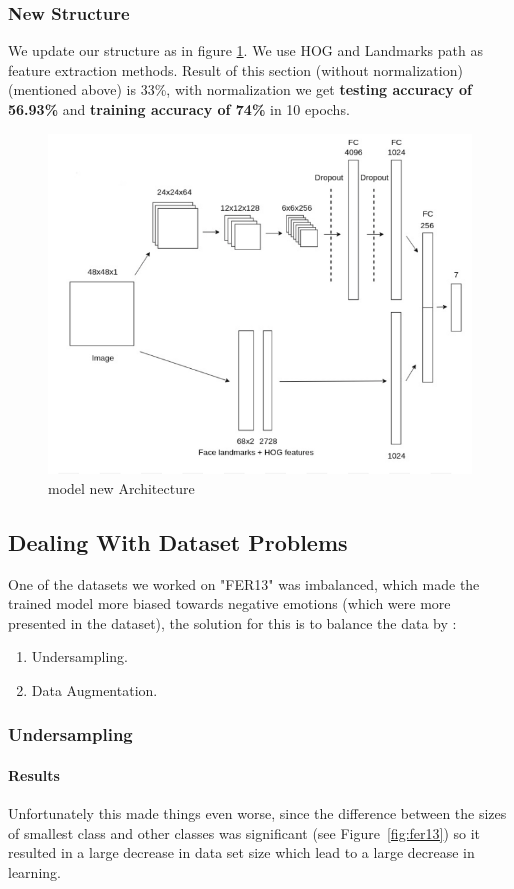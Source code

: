 \subsubsection{New Structure}
We update our structure as in figure \ref{arch}. 
We use HOG and Landmarks path as feature extraction methods.\newline
Result of this section (without normalization) (mentioned above) is 33\%,
with normalization we get \textbf{testing accuracy of 56.93\%} and \textbf{training accuracy of 74\%} in 10 epochs. 

\begin{figure}
	\centering
	\includegraphics[width=.7\textwidth]{images/Arch.png}
	\caption{model new Architecture}
	\label{arch}
\end{figure}

\subsection{Dealing With Dataset Problems}
One of the datasets we worked on "FER13" was imbalanced, which made the trained model more biased towards negative emotions (which were more presented in the dataset), the solution for this is to balance the data by :
\begin{enumerate}
	\item Undersampling.
	\item Data Augmentation.
\end{enumerate}
\subsubsection{Undersampling}
\paragraph{Results}
Unfortunately this made things even worse, since the difference between the sizes of smallest class and other classes was significant (see Figure~\ref{fig:fer13}) so it resulted in a large decrease in data set size which lead to a large decrease in learning.\newline


